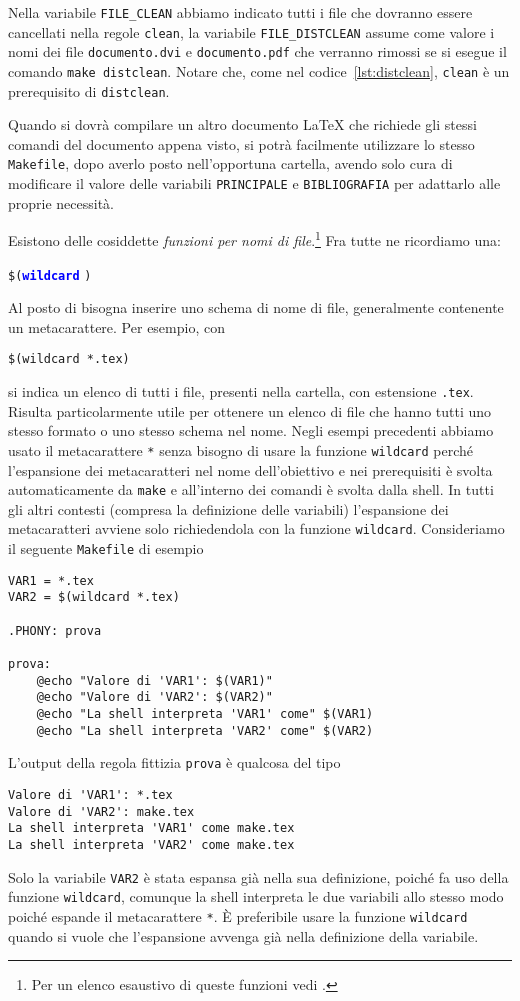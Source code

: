 Nella variabile \texttt{FILE\_CLEAN} abbiamo indicato tutti i file che dovranno
essere cancellati nella regole \texttt{clean}, la variabile
\texttt{FILE\_DISTCLEAN} assume come valore i nomi dei file
\texttt{documento.dvi} e \texttt{documento.pdf} che verranno rimossi se si
esegue il comando \texttt{make distclean}.  Notare che, come nel
codice~\ref{lst:distclean}, \texttt{clean} è un prerequisito di
\texttt{distclean}.

Quando si dovrà compilare un altro documento \LaTeX{}
che richiede gli stessi comandi del documento appena visto, si potrà facilmente
utilizzare lo stesso \texttt{Makefile}, dopo averlo posto nell'opportuna
cartella, avendo solo cura di modificare il valore delle variabili
\texttt{PRINCIPALE} e \texttt{BIBLIOGRAFIA} per adattarlo alle proprie
necessità.

Esistono delle cosiddette \emph{funzioni per nomi di
  file}.\footnote{Per
  un elenco esaustivo di queste funzioni vedi \cite[pagina 83]{gnu:make}.}
Fra tutte ne ricordiamo una:
\begin{sintassi}
  \small \texttt{\$(\textcolor{blue}{\textbf{wildcard}}}
  \texttt{)}
\end{sintassi}
Al posto di  bisogna inserire uno schema di nome di file,
generalmente contenente un metacarattere. Per esempio, con
\begin{lstlisting}
$(wildcard *.tex)
\end{lstlisting} %
si indica un elenco di tutti i file, presenti nella cartella, con estensione
\texttt{.tex}.  Risulta particolarmente utile per ottenere un elenco di file che
hanno tutti uno stesso formato o uno stesso schema nel nome.  Negli esempi
precedenti abbiamo usato il metacarattere \texttt{*} senza bisogno di usare la
funzione \texttt{wildcard} perché l'espansione dei metacaratteri nel nome
dell'obiettivo e nei prerequisiti è svolta automaticamente da \texttt{make} e
all'interno dei comandi è svolta dalla shell.  In tutti gli altri contesti
(compresa la definizione delle variabili) l'espansione dei metacaratteri avviene
solo richiedendola con la funzione \texttt{wildcard}.  Consideriamo il seguente
\texttt{Makefile} di esempio
\begin{lstlisting}
VAR1 = *.tex
VAR2 = $(wildcard *.tex)

.PHONY: prova

prova:
	@echo "Valore di 'VAR1': $(VAR1)"
	@echo "Valore di 'VAR2': $(VAR2)"
	@echo "La shell interpreta 'VAR1' come" $(VAR1)
	@echo "La shell interpreta 'VAR2' come" $(VAR2)
\end{lstlisting}
L'output della regola fittizia \texttt{prova} è qualcosa del tipo
\begin{verbatim}
Valore di 'VAR1': *.tex
Valore di 'VAR2': make.tex
La shell interpreta 'VAR1' come make.tex
La shell interpreta 'VAR2' come make.tex
\end{verbatim}
Solo la variabile \texttt{VAR2} è stata espansa già nella sua definizione,
poiché fa uso della funzione \texttt{wildcard}, comunque la shell interpreta le
due variabili allo stesso modo poiché espande il metacarattere \texttt{*}.  È
preferibile usare la funzione \texttt{wildcard} quando si vuole che l'espansione
avvenga già nella definizione della variabile.

